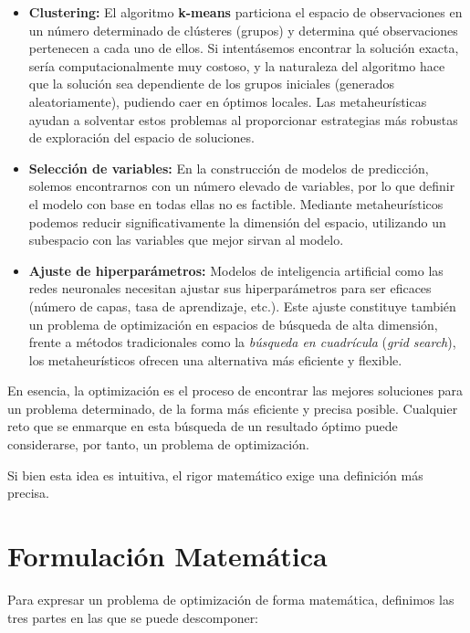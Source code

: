 \documentclass[12pt,a4paper]{book}
\begin{document}
\begin{itemize}
    \item \textbf{Clustering:} El algoritmo \textbf{k-means} particiona el espacio de observaciones en un número determinado de clústeres (grupos) y determina qué observaciones pertenecen a cada uno de ellos. 
    Si intentásemos encontrar la solución exacta, sería computacionalmente muy costoso, y la naturaleza del algoritmo hace que la solución sea dependiente de los grupos iniciales (generados aleatoriamente), pudiendo caer en óptimos locales.
    Las metaheurísticas ayudan a solventar estos problemas al proporcionar estrategias más robustas de exploración del espacio de soluciones.
    
    \item \textbf{Selección de variables:} En la construcción de modelos de predicción, solemos encontrarnos con un número elevado de variables, por lo que definir el modelo con base en todas ellas no es factible. Mediante metaheurísticos podemos 
    reducir significativamente la dimensión del espacio, utilizando un subespacio con las variables que mejor sirvan al modelo.
    
    \item \textbf{Ajuste de hiperparámetros:} Modelos de inteligencia artificial como las redes neuronales necesitan ajustar sus hiperparámetros para ser eficaces (número de capas, tasa de aprendizaje, etc.). Este ajuste constituye también un problema de optimización en espacios de búsqueda de alta dimensión, frente a métodos tradicionales como la \textit{búsqueda en cuadrícula} (\textit{grid search}), los metaheurísticos ofrecen una alternativa más eficiente y flexible.
\end{itemize}



En esencia, la optimización es el proceso de encontrar las mejores soluciones para un problema determinado, de la forma más eficiente y precisa posible.
Cualquier reto que se enmarque en esta búsqueda de un resultado óptimo puede considerarse, por tanto, un problema de optimización.

Si bien esta idea es intuitiva, el rigor matemático exige una definición más precisa.

\section{Formulación Matemática}

Para expresar un problema de optimización de forma matemática, definimos las tres partes en las que se puede descomponer:
\end{document}
